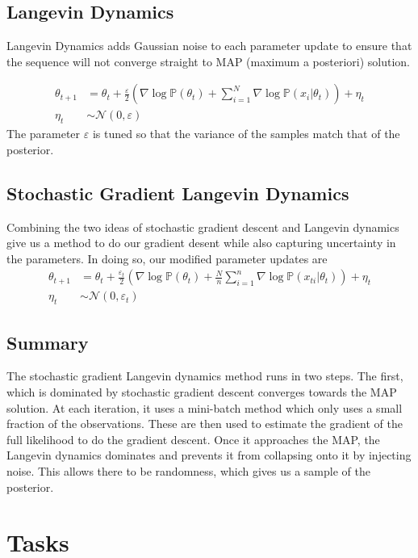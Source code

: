 \documentclass[letterpaper,12pt]{amsart}
\newcommand{\sumin}{\sum_{i=1}^n}
\newcommand{\p}[1]{\mathbb{P}\!\left(#1\right)}
\newcommand{\sN}{\mathcal{N}}
\begin{document}
\subsection{Langevin Dynamics}
Langevin Dynamics adds Gaussian noise to each parameter update to ensure that the sequence will not converge straight to MAP (maximum a posteriori) solution. 

\begin{align*}
\theta_{t+1} &= \theta_t + \frac{\varepsilon}{2}\left(\nabla \log \p{\theta_t} + \sum_{i=1}^N \nabla \log \p{x_i | \theta_t} \right) + \eta_t\\
\eta_t &\sim \sN(0, \varepsilon)
\end{align*}
The parameter $\varepsilon$ is tuned so that the variance of the samples match that of the posterior.

\subsection{Stochastic Gradient Langevin Dynamics}
Combining the two ideas of stochastic gradient descent and Langevin dynamics give us a method to do our gradient desent while also capturing uncertainty in the parameters. In doing so, our modified parameter updates are
\begin{align*}
\theta_{t+1} &= \theta_t + \frac{\varepsilon_t}{2}\left(\nabla \log \p{\theta_t} + \frac{N}{n}\sumin \nabla \log \p{x_{ti} | \theta_t} \right) + \eta_t\\
\eta_t &\sim \sN(0, \varepsilon_t)
\end{align*}

\subsection{Summary}
The stochastic gradient Langevin dynamics method runs in two steps. The first, which is dominated by stochastic gradient descent converges towards the MAP solution. At each iteration, it uses a mini-batch method which only uses a small fraction of the observations. These are then used to estimate the gradient of the full likelihood to do the gradient descent. Once it approaches the MAP, the Langevin dynamics dominates and prevents it from collapsing onto it by injecting noise. This allows there to be randomness, which gives us a sample of the posterior.


\section{Tasks}
\end{document}
